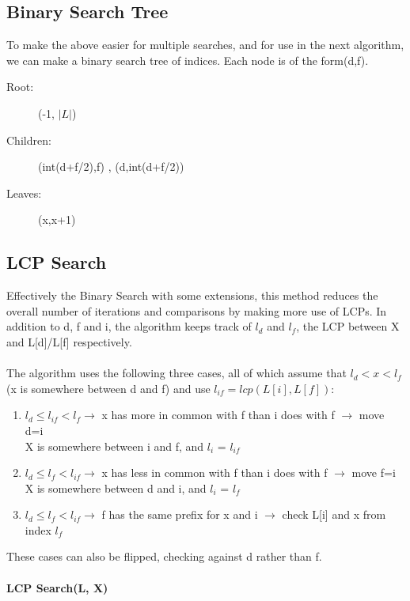 \subsection{Binary Search Tree}
To make the above easier for multiple searches, and for use in the next algorithm, we can make a binary search tree of indices. Each node is of the form(d,f).
\begin{description}
    \item [Root:] (-1, $|L|$)
    \item [Children:] (int(d+f/2),f) , (d,int(d+f/2))
    \item [Leaves:] (x,x+1)
\end{description}


\subsection{LCP Search}
Effectively the Binary Search with some extensions, this method reduces the overall number of iterations and comparisons by making more use of LCPs. In addition to d, f and i, the algorithm keeps track of $l_d$ and $l_f$, the LCP between X and L[d]/L[f] respectively.\\ \\
The algorithm uses the following three cases, all of which assume that \(l_d < x < l_f\) (x is somewhere between d and f) and use $l_{if} = lcp(L[i],L[f])$:
\begin{enumerate}
    \item \(l_d \leq l_{if} < l_f \rightarrow\) x has more in common with f than i does with f $\rightarrow$ move d=i \\
    X is somewhere between i and f, and $l_i$ = $l_{if}$
    \item \(l_d \leq l_f < l_{if} \rightarrow\) x has less in common with f than i does with f $\rightarrow$ move f=i \\     
    X is somewhere between d and i, and $l_i$ = $l_{f}$
    \item \(l_d \leq l_f < l_{if} \rightarrow\) f has the same prefix for x and i $\rightarrow$ check L[i] and x from index $l_f$         
\end{enumerate}
These cases can also be flipped, checking against d rather than f. \\ \\
\textbf{LCP Search(L, X)} 
